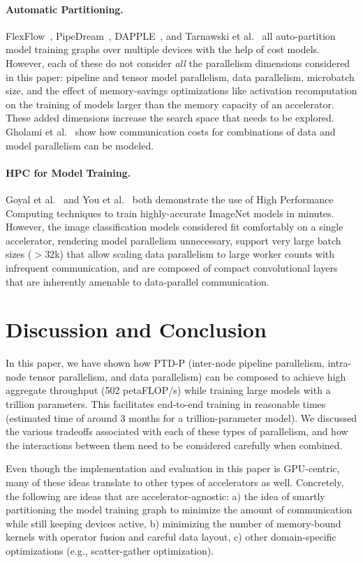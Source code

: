 \paragraph{Automatic Partitioning.} FlexFlow~\cite{flexflow}, PipeDream~\cite{narayanan2019pipedream}, DAPPLE~\cite{fan2021dapple}, and Tarnawski et al.~\cite{tarnawski2020efficient} all auto-partition model training graphs over multiple devices with the help of cost models. However, each of these do not consider \emph{all} the parallelism dimensions considered in this paper: pipeline and tensor model parallelism, data parallelism, microbatch size, and the effect of memory-savings optimizations like activation recomputation on the training of models larger than the memory capacity of an accelerator. These added dimensions increase the search space that needs to be explored. Gholami et al.~\cite{gholami2018integrated} show how communication costs for combinations of data and model parallelism can be modeled.

\paragraph{HPC for Model Training.} Goyal et al.~\cite{goyal2017accurate} and You et al.~\cite{you2018imagenet} both demonstrate the use of High Performance Computing techniques to train highly-accurate ImageNet models in minutes. However, the image classification models considered fit comfortably on a single accelerator, rendering model parallelism unnecessary, support very large batch sizes ($>32$k) that allow scaling data parallelism to large worker counts with infrequent communication, and are composed of compact convolutional layers that are inherently amenable to data-parallel communication.

\section{Discussion and Conclusion}

In this paper, we have shown how PTD-P (inter-node pipeline parallelism, intra-node tensor parallelism, and data parallelism) can be composed to achieve high aggregate throughput (502 petaFLOP/s) while training large models with a trillion parameters. This facilitates end-to-end training in reasonable times (estimated time of around 3 months for a trillion-parameter model). We discussed the various tradeoffs associated with each of these types of parallelism, and how the interactions between them need to be considered carefully when combined.

Even though the implementation and evaluation in this paper is GPU-centric, many of these ideas translate to other types of accelerators as well. Concretely, the following are ideas that are accelerator-agnostic: a) the idea of smartly partitioning the model training graph to minimize the amount of communication while still keeping devices active, b) minimizing the number of memory-bound kernels with operator fusion and careful data layout, c) other domain-specific optimizations (e.g., scatter-gather optimization).


